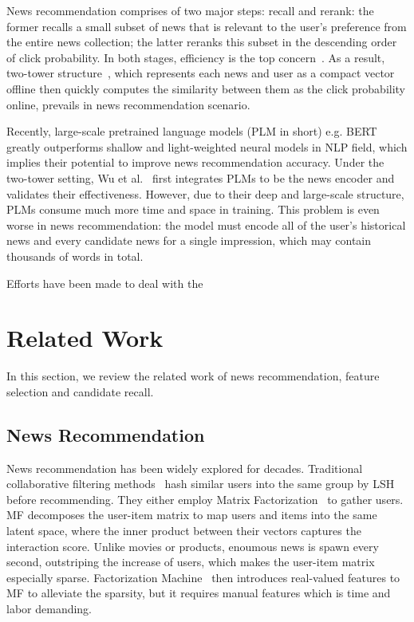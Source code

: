 \documentclass[sigconf,anonymous]{acmart}
\begin{document}
News recommendation comprises of two major steps: recall and rerank: the former recalls a small subset of news that is relevant to the user's preference from the entire news collection; the latter reranks this subset in the descending order of click probability. In both stages, efficiency is the top concern~\cite{liu_Hifi-ark,LightRec}. As a result, two-tower structure~\cite{wu_NPA,wu_NRMS,wu_topic-aware,wang_DKN,lian_DFM}, which represents each news and user as a compact vector offline then quickly computes the similarity between them as the click probability online, prevails in news recommendation scenario.

Recently, large-scale pretrained language models (PLM in short) e.g. BERT~\cite{Bert} greatly outperforms shallow and light-weighted neural models in NLP field, which implies their potential to improve news recommendation accuracy. Under the two-tower setting, Wu et al.~\cite{wu_newsPLM} first integrates PLMs to be the news encoder and validates their effectiveness. However, due to their deep and large-scale structure, PLMs consume much more time and space in training. This problem is even worse in news recommendation: the model must encode all of the user's historical news and every candidate news for a single impression, which may contain thousands of words in total.


Efforts have been made to deal with the




\section{Related Work}
\label{section:related work}
In this section, we review the related work of news recommendation, feature selection and candidate recall.
\subsection{News Recommendation}
News recommendation has been widely explored for decades. Traditional collaborative filtering methods~\cite{das_CF, li_SCENE} hash similar users into the same group by LSH before recommending. They either employ Matrix Factorization~\cite{koren_MF} to gather users. MF decomposes the user-item matrix to map users and items into the same latent space, where the inner product between their vectors captures the interaction score. Unlike movies or products, enoumous news is spawn every second, outstriping the increase of users, which makes the user-item matrix especially sparse. Factorization Machine~\cite{rendle_FM} then introduces real-valued features to MF to alleviate the sparsity, but it requires manual features which is time and labor demanding.
\end{document}
